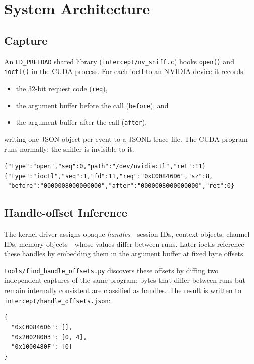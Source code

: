 \documentclass[11pt,a4paper]{article}
\begin{document}
\section{System Architecture}
\label{sec:arch}

\subsection{Capture}

An \texttt{LD\_PRELOAD} shared library (\texttt{intercept/nv\_sniff.c})
hooks \texttt{open()} and \texttt{ioctl()} in the CUDA process.
For each ioctl to an NVIDIA device it records:
\begin{itemize}[leftmargin=*]
  \item the 32-bit request code (\texttt{req}),
  \item the argument buffer before the call (\texttt{before}), and
  \item the argument buffer after the call (\texttt{after}),
\end{itemize}
writing one JSON object per event to a JSONL trace file.
The CUDA program runs normally; the sniffer is invisible to it.

\begin{lstlisting}[style=json, caption={Example JSONL trace lines.}]
{"type":"open","seq":0,"path":"/dev/nvidiactl","ret":11}
{"type":"ioctl","seq":1,"fd":11,"req":"0xC00846D6","sz":8,
 "before":"0000008000000000","after":"0000008000000000","ret":0}
\end{lstlisting}

\subsection{Handle-offset Inference}

The kernel driver assigns opaque \emph{handles}---session IDs, context
objects, channel IDs, memory objects---whose values differ between runs.
Later ioctls reference these handles by embedding them in the argument
buffer at fixed byte offsets.

\texttt{tools/find\_handle\_offsets.py} discovers these offsets by diffing
two independent captures of the same program: bytes that differ between
runs but remain internally consistent are classified as handles.
The result is written to \texttt{intercept/handle\_offsets.json}:

\begin{lstlisting}[style=json, caption={Fragment of \texttt{handle\_offsets.json}.}]
{
  "0xC00846D6": [],
  "0x20028003": [0, 4],
  "0x1000480F": [0]
}
\end{lstlisting}
\end{document}

